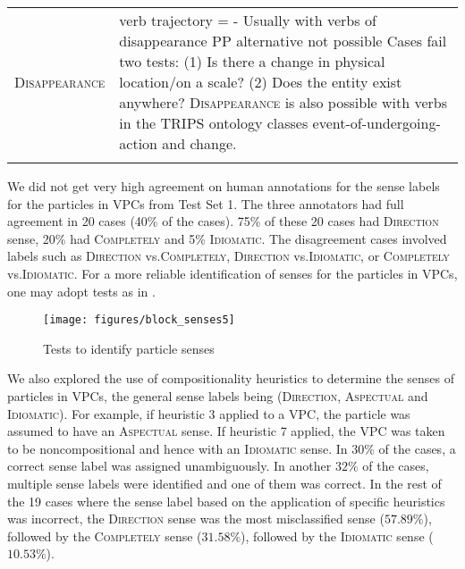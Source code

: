 \documentclass[output=paper
,modfonts
,nonflat]{langsci/langscibook}
\begin{document}
\begin{table}
{\begin{tabular}{p{2.5in}p{8.9in}}
  \textsc{Disappearance}
    & verb trajectory = - \newline Usually with verbs of disappearance \newline PP alternative not possible \newline Cases fail two tests: (1) Is there a change in physical location/on a scale? (2) Does the entity exist anywhere? \newline \textsc{Disappearance} is also possible with verbs in the TRIPS ontology classes event-of-undergoing-action and change.\\
  \lspbottomrule
 \end{tabular}}
\end{table}

We did not get very high agreement on human annotations for the sense labels for the particles in VPCs from Test Set 1. The three annotators had full agreement in 20 cases (40\% of the cases). 75\% of these 20 cases had \textsc{Direction} sense, 20\% had \textsc{Completely} and 5\% \textsc{Idiomatic}. The disagreement cases involved labels such as \textsc{Direction} vs.\textsc{Completely}, \textsc{Direction} vs.\textsc{Idiomatic}, or \textsc{Completely} vs.\textsc{Idiomatic}. For a more reliable identification of senses for the particles in VPCs, one may adopt tests as in .

\begin{figure}[h]
\vspace*{-1mm}
\texttt{[image: figures/block\_senses5]}
\vspace*{-2mm}
\caption{Tests to identify particle senses}\label{fig:tests-senses}
\end{figure}



We also explored the use of compositionality heuristics to determine the senses of particles in VPCs, the general sense labels being (\textsc{Direction}, \textsc{Aspectual} and \textsc{Idiomatic}). For example, if heuristic 3 applied to a VPC, the particle was assumed to have an \textsc{Aspectual} sense. If heuristic 7 applied, the VPC was taken to be noncompositional and hence with an \textsc{Idiomatic} sense. In $30\%$ of the cases, a correct sense label was assigned unambiguously. In another $32\%$ of the cases, multiple sense labels were identified and one of them was correct. In the rest of the 19 cases where the sense label based on the application of specific heuristics was incorrect, the \textsc{Direction} sense was the most misclassified sense ($57.89\%$), followed by the \textsc{Completely} sense ($31.58\%$), followed by the \textsc{Idiomatic} sense ($10.53\%$).
\end{document}
